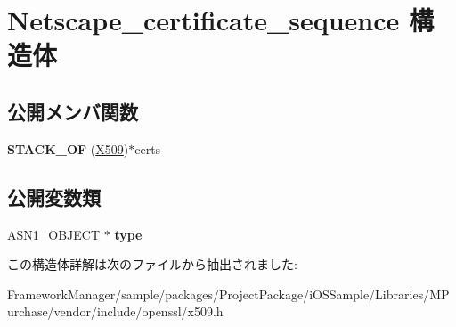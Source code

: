 \hypertarget{struct_netscape__certificate__sequence}{}\section{Netscape\+\_\+certificate\+\_\+sequence 構造体}
\label{struct_netscape__certificate__sequence}
\subsection*{公開メンバ関数}
\begin{DoxyCompactItemize}
\item 
\hypertarget{struct_netscape__certificate__sequence_aa4ffb7847fcdf0e15483c03c5009906a}{}{\bfseries S\+T\+A\+C\+K\+\_\+\+O\+F} (\hyperlink{structx509__st}{X509})$\ast$certs\label{struct_netscape__certificate__sequence_aa4ffb7847fcdf0e15483c03c5009906a}

\end{DoxyCompactItemize}
\subsection*{公開変数類}
\begin{DoxyCompactItemize}
\item 
\hypertarget{struct_netscape__certificate__sequence_afd433b93f52456a10aaf3d824b295a94}{}\hyperlink{structasn1__object__st}{A\+S\+N1\+\_\+\+O\+B\+J\+E\+C\+T} $\ast$ {\bfseries type}\label{struct_netscape__certificate__sequence_afd433b93f52456a10aaf3d824b295a94}

\end{DoxyCompactItemize}


この構造体詳解は次のファイルから抽出されました\+:\begin{DoxyCompactItemize}
\item 
Framework\+Manager/sample/packages/\+Project\+Package/i\+O\+S\+Sample/\+Libraries/\+M\+Purchase/vendor/include/openssl/x509.\+h\end{DoxyCompactItemize}
